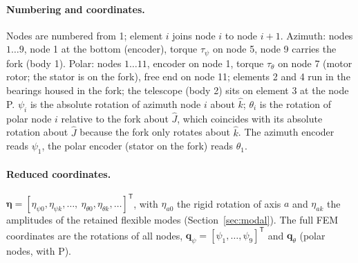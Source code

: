 \documentclass[10pt,a4paper]{article}
\numberwithin{equation}{section}
\begin{document}
\paragraph{Numbering and coordinates.} Nodes are numbered from 1; element $i$ joins node $i$ to node $i+1$.
Azimuth: nodes $1\dots9$, node 1 at the bottom (encoder), torque $\tau_\psi$ on node 5, node 9 carries the fork
(body 1). Polar: nodes $1\dots11$, encoder on node 1, torque $\tau_\theta$ on node 7 (motor rotor; the stator is
on the fork), free end on node 11; elements 2 and 4 run in the bearings housed in the fork; the telescope
(body 2) sits on element 3 at the node P. $\psi_i$ is the absolute rotation of azimuth node $i$ about $\hat k$;
$\theta_i$ is the rotation of polar node $i$ relative to the fork about $\hat J$, which coincides with its
absolute rotation about $\hat J$ because the fork only rotates about $\hat k$. The azimuth encoder reads
$\psi_1$, the polar encoder (stator on the fork) reads $\theta_1$.

\paragraph{Reduced coordinates.} $\boldsymbol\eta = [\eta_{\psi0}, \eta_{\psi k}, \dots,\
\eta_{\theta0}, \eta_{\theta k}, \dots]^{\mathsf T}$, with $\eta_{a0}$ the rigid rotation of axis $a$ and $\eta_{ak}$
the amplitudes of the retained flexible modes (Section~\ref{sec:modal}). The full FEM coordinates are the
rotations of all nodes, $\mathbf q_\psi = [\psi_1, \dots, \psi_9]^{\mathsf T}$ and $\mathbf q_\theta$ (polar
nodes, with P).
\end{document}
